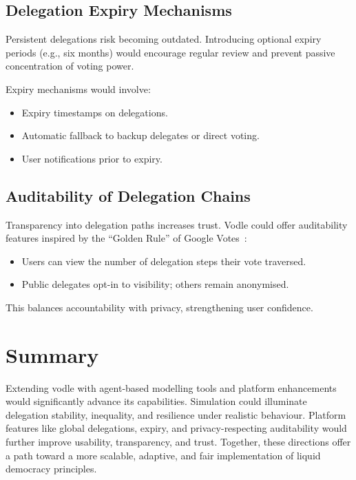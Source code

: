 \subsection{Delegation Expiry Mechanisms}

Persistent delegations risk becoming outdated. Introducing optional expiry periods (e.g., six months) would encourage regular review and prevent passive concentration of voting power.

Expiry mechanisms would involve:

\begin{itemize}
    \item Expiry timestamps on delegations.
    \item Automatic fallback to backup delegates or direct voting.
    \item User notifications prior to expiry.
\end{itemize}

\subsection{Auditability of Delegation Chains}

Transparency into delegation paths increases trust. Vodle could offer auditability features inspired by the ``Golden Rule'' of Google Votes~\citep{hardt_google_2015}:

\begin{itemize}
    \item Users can view the number of delegation steps their vote traversed.
    \item Public delegates opt-in to visibility; others remain anonymised.
\end{itemize}

This balances accountability with privacy, strengthening user confidence.

\section{Summary}

Extending vodle with agent-based modelling tools and platform enhancements would significantly advance its capabilities. Simulation could illuminate delegation stability, inequality, and resilience under realistic behaviour. Platform features like global delegations, expiry, and privacy-respecting auditability would further improve usability, transparency, and trust. Together, these directions offer a path toward a more scalable, adaptive, and fair implementation of liquid democracy principles.

